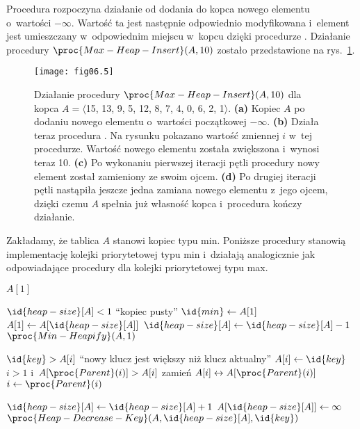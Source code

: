 \exercise %
Procedura  rozpoczyna działanie od dodania do kopca nowego elementu o~wartości $-\infty$. Wartość ta jest następnie odpowiednio modyfikowana i~element jest umieszczany w~odpowiednim miejscu w~kopcu dzięki procedurze . Działanie procedury $\proc{Max-Heap-Insert}(A,10)$ zostało przedstawione na rys.~\ref{fig:6.5-2}.
\begin{figure}[ht]
	\begin{center}
		\texttt{[image: fig06.5]}
	\end{center}
	\caption{Działanie procedury $\proc{Max-Heap-Insert}(A,10)$ dla kopca $A=\langle$15, 13, 9, 5, 12, 8, 7, 4, 0, 6, 2, 1$\rangle$. {\sffamily\bfseries(a)} Kopiec $A$ po dodaniu nowego elementu o~wartości początkowej $-\infty$. {\sffamily\bfseries(b)} Działa teraz procedura . Na rysunku pokazano wartość zmiennej $i$ w~tej procedurze. Wartość nowego elementu została zwiększona i~wynosi teraz 10. {\sffamily\bfseries(c)} Po wykonaniu pierwszej iteracji pętli  procedury  nowy element został zamieniony ze swoim ojcem. {\sffamily\bfseries(d)} Po drugiej iteracji pętli nastąpiła jeszcze jedna zamiana nowego elementu z~jego ojcem, dzięki czemu $A$ spełnia już własność kopca i~procedura kończy działanie.} \label{fig:6.5-2}
\end{figure}

\exercise %
Zakładamy, że tablica $A$ stanowi kopiec typu min. Poniższe procedury stanowią implementację kolejki priorytetowej typu min i~działają analogicznie jak odpowiadające procedury dla kolejki priorytetowej typu max.
\begin{codebox}
\li	\Return $A[1]$
\end{codebox}
\begin{codebox}
\li	\If $\id{heap-size}[A]<1$
\li		\Then \Error ``kopiec pusty''
		\End
\li	$\id{min}\gets A[1]$
\li	$A[1]\gets A[\id{heap-size}[A]]$
\li	$\id{heap-size}[A]\gets\id{heap-size}[A]-1$
\li	$\proc{Min-Heapify}(A,1)$
\li	\Return {}
\end{codebox}
\begin{codebox}
\li	\If $\id{key}>A[i]$
\li		\Then \Error ``nowy klucz jest większy niż klucz aktualny''
		\End
\li	$A[i]\gets\id{key}$
\li	\While $i>1$ i~$A[\proc{Parent}(i)]>A[i]$
\li		\Do
			zamień $A[i]\leftrightarrow A[\proc{Parent}(i)]$
\li			$i\gets\proc{Parent}(i)$
		\End
\end{codebox}
\begin{codebox}
\li	$\id{heap-size}[A]\gets\id{heap-size}[A]+1$
\li	$A[\id{heap-size}[A]]\gets\infty$
\li	$\proc{Heap-Decrease-Key}(A,\id{heap-size}[A],\id{key})$
\end{codebox}

